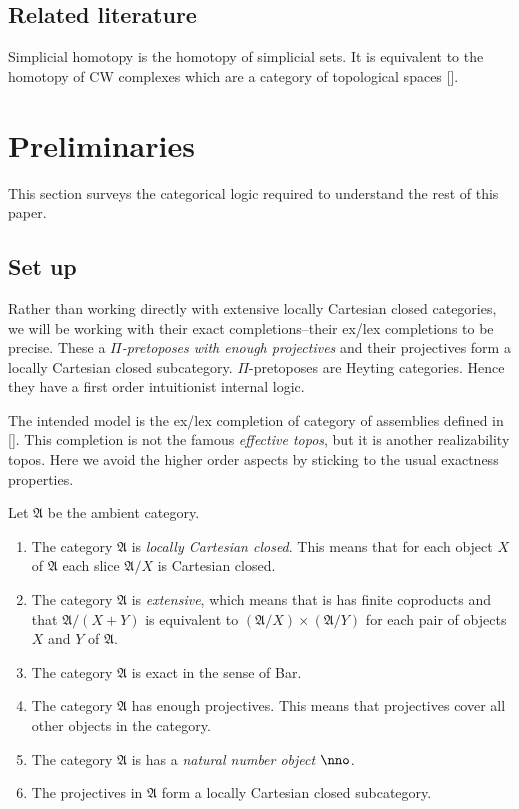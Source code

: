 \documentclass{tac}
\newcommand\hide[1]{}
\newcommand\citep[1]{[\cite{#1}]}
\newcommand\ambient{\mathfrak A}
\begin{document}
\hide{
Take the exact completion of a ELCCC with NNO. The result is a $\Pi$-pretopos with NNO, enough projective and projectives that form a locally Cartesian closed subcategory. Not necessarily all W-types are available, but I don't need them in my proofs. The advantage is that I can get away from Thomas' extensional type theory, and back to the exact completions I am at home in.
}

\subsection{Related literature}
Simplicial homotopy is the homotopy of simplicial sets. It is equivalent to the homotopy of CW complexes which are a category of topological spaces \citep{Hovey99,GJSHT}.

\section{Preliminaries}
This section surveys the categorical logic required to understand the rest of this paper.

\subsection{Set up}
Rather than working directly with extensive locally Cartesian closed categories, we will be working with their exact completions--their ex/lex completions to be precise. These a \emph{$\Pi$-pretoposes with enough projectives} and their projectives form a locally Cartesian closed subcategory. $\Pi$-pretoposes are Heyting categories. Hence they have a first order intuitionist internal logic.

The intended model is the ex/lex completion of category of assemblies defined in \citep{MR1097022,MR1023803,MR2479466}. This completion is not the famous \emph{effective topos}, but it is another realizability topos. Here we avoid the higher order aspects by sticking to the usual exactness properties.

Let $\ambient$ be the ambient category.
\begin{enumerate}
\item The category $\ambient$ is \emph{locally Cartesian closed}. This means that for each object $X$ of $\ambient$ each slice $\ambient/X$ is Cartesian closed.
\item The category $\ambient$ is \emph{extensive}, which means that is has finite coproducts and that $\ambient/(X+Y)$ is equivalent to $(\ambient/X)\times(\ambient/Y)$ for each pair of objects $X$ and $Y$ of $\ambient$.
\item The category $\ambient$ is exact in the sense of Bar.
\item The category $\ambient$ has enough projectives. This means that projectives cover all other objects in the category.
\item The category $\ambient$ is has a \emph{natural number object} $\nno$.
\item The projectives in $\ambient$ form a locally Cartesian closed subcategory.
\end{enumerate}
\end{document}
